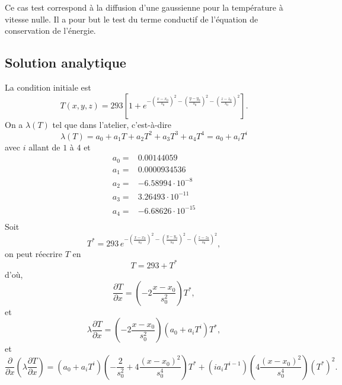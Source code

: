 Ce cas test correspond \`a la diffusion d'une gaussienne pour la temp\'erature \`a vitesse nulle. Il a pour but le test du terme conductif de l'\'equation de conservation de l'\'energie.

\subsection{Solution analytique}

La condition initiale est
\begin{equation}
T\left(x,y,z\right) = 293 \left[1 + e^{-\left(\frac{x-x_0}{s_0}\right)^2-\left(\frac{y-y_0}{s_0}\right)^2-\left(\frac{z-z_0}{s_0}\right)^2}\right].
\end{equation}
On a $\lambda\left(T\right)$ tel que dans l'atelier, c'est-\`a-dire
\begin{equation}
\lambda\left(T\right) = a_0+a_1 T +a_2 T^2 +a_3 T^3 + a_4 T^4 = a_0 + a_i T^i
\end{equation}
avec $i$ allant de $1$ \`a $4$ et
\begin{align*}
a_0 ={}& 0.00144059 \\
a_1 ={}& 0.0000934536 \\
a_2 ={}& -6.58994\cdot10^{-8} \\
a_3 ={}& 3.26493\cdot10^{-11} \\
a_4 ={}& -6.68626\cdot10^{-15} \\
\end{align*}
Soit
\begin{equation}
T^* = 293\, e^{-\left(\frac{x-x_0}{s_0}\right)^2-\left(\frac{y-y_0}{s_0}\right)^2-\left(\frac{z-z_0}{s_0}\right)^2},
\end{equation}
on peut r\'eecrire $T$ en
\begin{equation}
T = 293 + T^*
\end{equation}
d'o\`u,
\begin{equation}
\frac{\partial T}{\partial x} = \left(-2\frac{x-x_0}{s_0^2}\right) T^*,
\end{equation}
et
\begin{equation}
\lambda \frac{\partial T}{\partial x} = \left(-2\frac{x-x_0}{s_0^2}\right) \left(a_0+a_i T^i\right) T^*,
\end{equation}
et
\begin{equation}
\frac{\partial}{\partial x} \left(\lambda \frac{\partial T}{\partial x}\right) = \left(a_0 + a_i T^i\right) \left(-\frac{2}{s_0^2} + 4\frac{\left(x-x_0\right)^2}{s_0^4}\right) T^* + \left(i a_i T^{i-1}\right) \left( 4\frac{\left(x-x_0\right)^2}{s_0^4}\right) \left(T^*\right)^2.
\end{equation}
